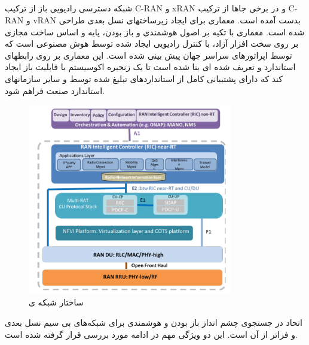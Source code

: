 \subsection{}
شبکه دسترسی رادیویی باز از ترکیب C-RAN و xRAN و در برخی جاها از ترکیب C-RAN و vRAN بدست آمده است.
معماری  برای ایجاد زیرساختهای  نسل بعدی طراحی شده است.
معماری  با تکیه بر اصول هوشمندی و باز بودن، پایه و اساس ساخت  مجازی بر روی سخت افزار آزاد، با کنترل رادیویی ایجاد شده توسط هوش مصنوعی است که توسط اپراتورهای سراسر جهان پیش بینی شده است.
این معماری بر روی رابطهای استاندارد و تعریف شده ای بنا شده است تا یک زنجیره اکوسیستم با قابلیت باز ایجاد کند که دارای پشتیبانی کامل از استانداردهای تبلیغ شده توسط  و سایر سازمانهای استاندارد صنعت فراهم شود.
\begin{figure}%
  \centering
    \includegraphics[width=0.8\textwidth]{./fig/oran1}
  \caption{ساختار شبکه ی  \cite{oranWP}}
  \label{fig:ORAN}
\end{figure}
اتحاد  در جستجوی چشم انداز باز بودن و هوشمندی برای شبکه‌های بی سیم نسل بعدی و فراتر از آن است\cite{oranWP}.
این دو ویژگی مهم در ادامه مورد بررسی قرار گرفته شده است.
